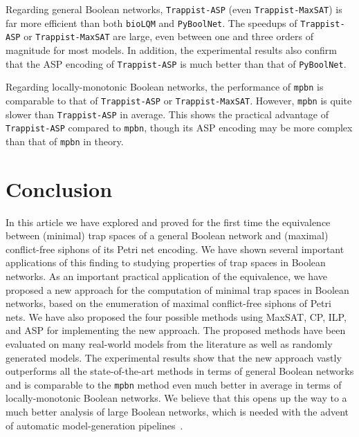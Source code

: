 \documentclass[preprint,12pt]{elsarticle}
\begin{document}
Regarding general Boolean networks, \texttt{Trappist-ASP} (even \texttt{Trappist-MaxSAT}) is far more efficient than both \texttt{bioLQM} and \texttt{PyBoolNet}.
The speedups of \texttt{Trappist-ASP} or \texttt{Trappist-MaxSAT} are large, even between one and three orders of magnitude for most models.
In addition, the experimental results also confirm that the ASP encoding of \texttt{Trappist-ASP} is much better than that of \texttt{PyBoolNet}.

Regarding locally-monotonic Boolean networks, the performance of \texttt{mpbn} is comparable to that of \texttt{Trappist-ASP} or \texttt{Trappist-MaxSAT}.
However, \texttt{mpbn} is quite slower than \texttt{Trappist-ASP} in average.
This shows the practical advantage of \texttt{Trappist-ASP} compared to \texttt{mpbn}, though its ASP encoding may be more complex than that of \texttt{mpbn} in theory.


\section{Conclusion}%
\label{sec:Conclusion}

In this article we have explored and proved for the first time the equivalence between (minimal) trap spaces of a general Boolean network and (maximal) conflict-free siphons of its Petri net encoding.
We have shown several important applications of this finding to studying properties of trap spaces in Boolean networks.
As an important practical application of the equivalence, we have proposed a new approach for the computation of minimal trap spaces in Boolean networks, based on the enumeration of maximal conflict-free siphons of Petri nets.
We have also proposed the four possible methods using MaxSAT, CP, ILP, and ASP for implementing the new approach.
The proposed methods have been evaluated on many real-world models from the literature as well as randomly generated models.
The experimental results show that the new approach vastly outperforms all the state-of-the-art methods in terms of general Boolean networks and is comparable to the \texttt{mpbn} method even much better in average in terms of locally-monotonic Boolean networks.
We believe that this opens up the way to a much better analysis of large Boolean networks, which is needed with the advent of automatic model-generation pipelines~\cite{ostaszewski2021covid19}.
\end{document}

